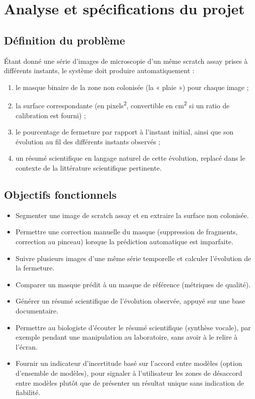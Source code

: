 \documentclass[12pt,a4paper]{report}
\begin{document}
\chapter{Analyse et spécifications du projet}

\section{Définition du problème}

Étant donné une série d'images de microscopie d'un même scratch assay prises à différents instants, le système doit produire automatiquement :
\begin{enumerate}
\item le masque binaire de la zone non colonisée (la « plaie ») pour chaque image ;
\item la surface correspondante (en pixels\textsuperscript{2}, convertible en cm\textsuperscript{2} si un ratio de calibration est fourni) ;
\item le pourcentage de fermeture par rapport à l'instant initial, ainsi que son évolution au fil des différents instants observés ;
\item un résumé scientifique en langage naturel de cette évolution, replacé dans le contexte de la littérature scientifique pertinente.
\end{enumerate}

\section{Objectifs fonctionnels}

\begin{itemize}
\item Segmenter une image de scratch assay et en extraire la surface non colonisée.
\item Permettre une correction manuelle du masque (suppression de fragments, correction au pinceau) lorsque la prédiction automatique est imparfaite.
\item Suivre plusieurs images d'une même série temporelle et calculer l'évolution de la fermeture.
\item Comparer un masque prédit à un masque de référence (métriques de qualité).
\item Générer un résumé scientifique de l'évolution observée, appuyé sur une base documentaire.
\item Permettre au biologiste d'écouter le résumé scientifique (synthèse vocale), par exemple pendant une manipulation au laboratoire, sans avoir à le relire à l'écran.
\item Fournir un indicateur d'incertitude basé sur l'accord entre modèles (option d'ensemble de modèles), pour signaler à l'utilisateur les zones de désaccord entre modèles plutôt que de présenter un résultat unique sans indication de fiabilité.
\end{itemize}
\end{document}
